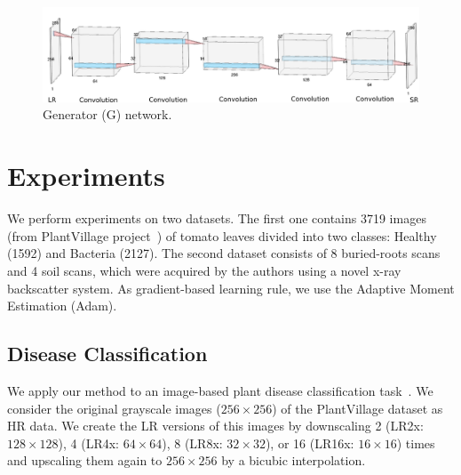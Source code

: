 \documentclass[10pt,twocolumn,letterpaper]{article}
\begin{document}
\begin{figure}[h]
\begin{center}
\includegraphics[scale=0.30]{G_net.png}
\end{center}
\label{fig:G_net}
\caption{Generator (G) network.}
\end{figure}

\section{Experiments}
\label{sec:experiments}

We perform experiments on two datasets. The first one contains 3719 images (from PlantVillage project~\cite{Hughes2015}) of tomato leaves divided into two classes: Healthy (1592) and Bacteria (2127). The second dataset consists of 8 buried-roots scans and 4 soil scans, which were acquired by the authors using a novel x-ray backscatter system. As gradient-based learning rule, we use the Adaptive Moment Estimation (Adam).

\subsection{Disease Classification}

We apply our method to an image-based plant disease classification task~\cite{Mohanty2016}. We consider the original grayscale images ($256\times 256$) of the PlantVillage dataset as HR data. We create the LR versions of this images by downscaling 2 (LR2x: $128\times 128$), 4 (LR4x: $64\times 64$), 8 (LR8x: $32\times 32$), or 16 (LR16x: $16\times 16$) times and upscaling them again to $256\times 256$ by a bicubic interpolation.
\end{document}
